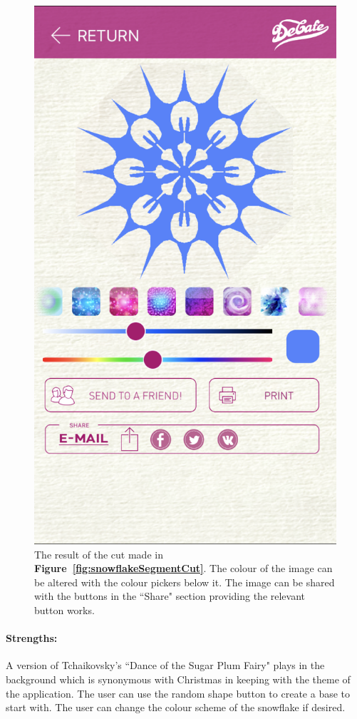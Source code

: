 \documentclass[11pt]{article}
\begin{document}
\begin{figure}[!ht]
\begin{minipage}{0.45\textwidth}
                            \includegraphics[width=0.7\linewidth]{Images/snowflakeResult}
                            \caption{The result of the cut made in \textbf{Figure~\ref{fig:snowflakeSegmentCut}}. The colour of the image can be altered with the colour pickers below it. The image can be shared with the buttons in the ``Share" section providing the relevant button works.}
                            \label{fig:snowflakeResult}
                        \end{minipage}
                    \end{figure}
                    
                    
                    
                \paragraph{Strengths:}
                A version of Tchaikovsky's ``Dance of the Sugar Plum Fairy" plays in the background which is synonymous with Christmas in keeping with the theme of the application. 
                The user can use the random shape button to create a base to start with. The user can change the colour scheme of the snowflake if desired.
                
\end{document}
